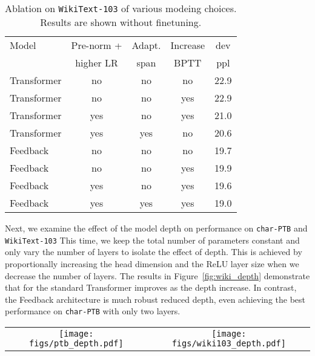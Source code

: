 \documentclass{article} \usepackage{iclr2021_conference}
\newcommand{\fig}[1]{Figure~\ref{fig:#1}}
\begin{document}
\begin{table}[t]
    \centering
    \begin{tabular}{lcccc}
    \toprule
    Model & Pre-norm + & Adapt. & Increase & dev \\
     & higher LR & span & BPTT & ppl \\
    \midrule
    Transformer  & no & no & no & 22.9 \\
    Transformer  & no & no & yes & 22.9 \\
    Transformer  & yes & no & yes & 21.0 \\
    Transformer  & yes & yes & no & 20.6 \\
    Feedback  & no & no & no & 19.7 \\
    Feedback  & no & no & yes & 19.9 \\
    Feedback  & yes & no & yes & 19.6 \\
    Feedback  & yes & yes & yes & 19.0 \\
    \bottomrule
    \end{tabular}
    \caption{
    Ablation on \texttt{WikiText-103} of various modeing choices. Results are shown without finetuning.   }
    \label{tab:wiki_abbl}
\end{table}

Next, we examine the effect of the model depth on performance on \texttt{char-PTB} and \texttt{WikiText-103}
This time, we keep the total number of parameters constant and only vary the number of layers to isolate the effect of depth. 
This is achieved by proportionally increasing the head dimension and the ReLU layer size when we decrease the number of layers.
The results in \fig{wiki_depth} demonstrate that for the standard Transformer improves as the depth increase.
In contrast, the Feedback architecture is much robust reduced depth, even achieving the best performance on \texttt{char-PTB} with only two layers.

\begin{figure*}[t]
   \centering
   \begin{tabular}{cc}
   \texttt{[image: figs/ptb\_depth.pdf]}&
   \texttt{[image: figs/wiki103\_depth.pdf]}
   \end{tabular}
   \vskip -4mm
   \caption{The performance on \textbf{(left)} \texttt{char-PTB} and \textbf{(right)}  \texttt{Wikitext-103} as a function of the model depth. The number of parameters is kept constant by increasing the width.}
   \label{fig:wiki_depth}
\end{figure*}
\end{document}
